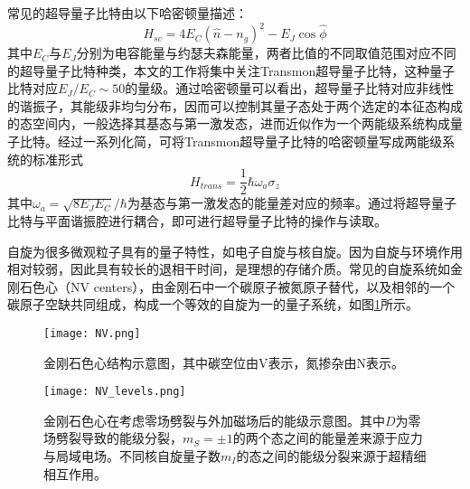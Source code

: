             常见的超导量子比特由以下哈密顿量描述：
            \begin{equation}
                H_{sc} = 4 E_C (\hat n - n_g)^2 -E_J \cos \hat \phi
            \end{equation}
            其中$ E_C $与$E_J$分别为电容能量与约瑟夫森能量，两者比值的不同取值范围对应不同的超导量子比特种类，本文的工作将集中关注Transmon超导量子比特，这种量子比特对应$E_J/E_C\sim 50$的量级\cite{koch2007charge}。通过哈密顿量可以看出，超导量子比特对应非线性的谐振子，其能级非均匀分布，因而可以控制其量子态处于两个选定的本征态构成的态空间内，一般选择其基态与第一激发态，进而近似作为一个两能级系统构成量子比特。经过一系列化简，可将Transmon超导量子比特的哈密顿量写成两能级系统的标准形式
            \begin{equation}
                H_{trans} = \frac{1}{2}\hbar \omega_a \sigma_z 
            \end{equation}
            其中$ \omega_a = \sqrt{8E_JE_C}/\hbar $为基态与第一激发态的能量差对应的频率。通过将超导量子比特与平面谐振腔进行耦合，即可进行超导量子比特的操作与读取。

            自旋为很多微观粒子具有的量子特性，如电子自旋与核自旋。因为自旋与环境作用相对较弱，因此具有较长的退相干时间，是理想的存储介质。常见的自旋系统如金刚石色心（NV centers），由金刚石中一个碳原子被氮原子替代，以及相邻的一个碳原子空缺共同组成，构成一个等效的自旋为一的量子系统，如图\ref{fig:NV_centers}所示。

            \begin{figure}[h]
                \centering
                \texttt{[image: NV.png]}
                \caption{金刚石色心结构示意图，其中碳空位由V表示，氮掺杂由N表示\cite{grezes2016towards}。}
                \label{fig:NV_centers}
            \end{figure}%

            \begin{figure}[h]
                \centering
                \texttt{[image: NV\_levels.png]}
                \caption{金刚石色心在考虑零场劈裂与外加磁场后的能级示意图。其中$D$为零场劈裂导致的能级分裂，$m_S = \pm1$的两个态之间的能量差来源于应力与局域电场。不同核自旋量子数$m_I$的态之间的能级分裂来源于超精细相互作用\cite{grezes2016towards}。}
                \label{fig:NV_levels}
            \end{figure}

